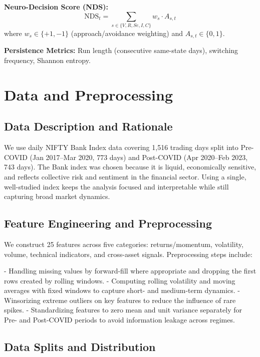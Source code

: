\documentclass[conference]{IEEEtran}
\begin{document}
\textbf{Neuro-Decision Score (NDS):}
\begin{equation}
\text{NDS}_t = \sum_{s \in \{V,R,Se,I,C\}} w_s \cdot A_{s,t}
\end{equation}
where $w_s \in \{+1, -1\}$ (approach/avoidance weighting) and $A_{s,t} \in \{0,1\}$.

\textbf{Persistence Metrics:} Run length (consecutive same-state days), switching frequency, Shannon entropy.

\section{Data and Preprocessing}

\subsection{Data Description and Rationale}

We use daily NIFTY Bank Index data covering 1,516 trading days split into Pre-COVID (Jan 2017--Mar 2020, 773 days) and Post-COVID (Apr 2020--Feb 2023, 743 days). The Bank index was chosen because it is liquid, economically sensitive, and reflects collective risk and sentiment in the financial sector. Using a single, well-studied index keeps the analysis focused and interpretable while still capturing broad market dynamics.

\subsection{Feature Engineering and Preprocessing}

We construct 25 features across five categories: returns/momentum, volatility, volume, technical indicators, and cross-asset signals. Preprocessing steps include:

- Handling missing values by forward-fill where appropriate and dropping the first rows created by rolling windows.
- Computing rolling volatility and moving averages with fixed windows to capture short- and medium-term dynamics.
- Winsorizing extreme outliers on key features to reduce the influence of rare spikes.
- Standardizing features to zero mean and unit variance separately for Pre- and Post-COVID periods to avoid information leakage across regimes.

\subsection{Data Splits and Distribution}
\end{document}
